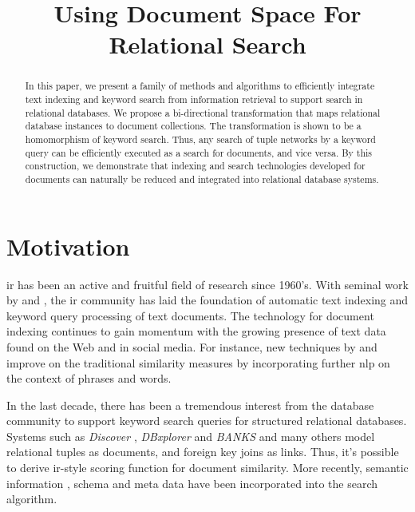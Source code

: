 \documentclass[conference]{IEEEtran}
\newcommand{\citeauthornum}[1]{\citeauthor*{#1} \cite{#1}}
\begin{document}
\title{Using Document Space For Relational Search}
\author{
    \and
}
\maketitle

\begin{abstract}
In this paper, we present a family of methods and algorithms to efficiently integrate text indexing and keyword search from information retrieval to support search in relational databases.  We propose a bi-directional transformation that maps relational database instances to document collections.  The transformation is shown to be a homomorphism of keyword search.  Thus, any search of tuple networks by a keyword query can be efficiently executed as a search for documents, and vice versa.  By this construction, we demonstrate that indexing and search technologies developed for documents can naturally be reduced and integrated into relational database systems.
\end{abstract}

\section{Motivation}

\Gls{ir} has been an active and fruitful field of research since 1960's.  With seminal work by \citeauthornum{jones72} and \citeauthornum{salton75}, the \gls{ir} community has laid the foundation of automatic text indexing and keyword query processing of text documents.  The technology for document indexing continues to gain momentum with the growing presence of text data found on the Web and in social media.  For instance, new techniques by \citeauthornum{janu12} and \citeauthornum{goyal13} improve on the traditional similarity measures by incorporating further \gls{nlp} on the context of phrases and words.

In the last decade, there has been a tremendous interest from the database community to support keyword search queries for structured relational databases.  Systems such as {\em Discover} \cite{hris02}, {\em DBxplorer} \cite{agrawal2002dbxplorer} and {\em BANKS} \cite{bhalotia2002keyword} and many others \cite{hristidis2003efficient,liu2006effective} model relational tuples as documents, and foreign key joins as links.  Thus, it's possible to derive \gls{ir}-style scoring function for document similarity.  More recently, semantic information \cite{zeng2013semantic}, schema and meta data \cite{bergamaschi2011keyword} have been incorporated into the search algorithm.
\end{document}
